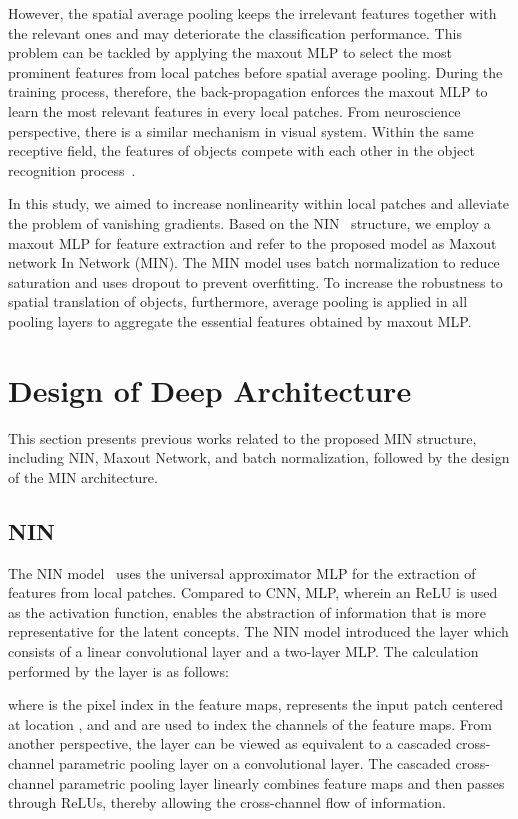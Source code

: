 \documentclass[10pt,twocolumn,letterpaper]{article}
\begin{document}
However, the spatial average pooling keeps the irrelevant features together with the relevant ones and may deteriorate the classification performance.
This problem can be tackled by applying the maxout MLP to select the most prominent features from local patches before spatial average pooling. 
During the training process, therefore, the back-propagation enforces the maxout MLP to learn the most relevant features in every local patches.
From neuroscience perspective, there is a similar mechanism in visual system.
Within the same receptive field, the features of objects compete with each other in the object recognition process~\cite{desimone1995neural}.

In this study, we aimed to increase nonlinearity within local patches and alleviate the problem of vanishing gradients. Based on the NIN~\cite{DBLP:journals/corr/LinCY13} structure, we employ a maxout MLP for feature extraction and refer to the proposed model as Maxout network In Network (MIN).
The MIN model uses batch normalization to reduce saturation and uses dropout to prevent overfitting.
To increase the robustness to spatial translation of objects, furthermore, average pooling is applied in all pooling layers to aggregate the essential features obtained by maxout MLP.


\section{Design of Deep Architecture}
	This section presents previous works related to the proposed MIN structure, including NIN, Maxout Network, and batch normalization, followed by the design of the MIN architecture.

\subsection{NIN}

	The NIN model~\cite{DBLP:journals/corr/LinCY13} uses the universal approximator MLP for the extraction of features from local patches.
Compared to CNN, MLP, wherein an ReLU is used as the activation function, enables the abstraction of information that is more representative for the latent concepts.
The NIN model introduced the  layer which consists of a linear convolutional layer and a two-layer MLP. The calculation performed by the  layer is as follows:

 


where  is the pixel index in the feature maps,  represents the input patch centered at location , and  and  are used to index the channels of the feature maps. From another perspective, the  layer can be viewed as equivalent to a cascaded cross-channel parametric pooling layer on a convolutional layer. The cascaded cross-channel parametric pooling layer linearly combines feature maps and then passes through ReLUs, thereby allowing the cross-channel flow of information.
\end{document}
